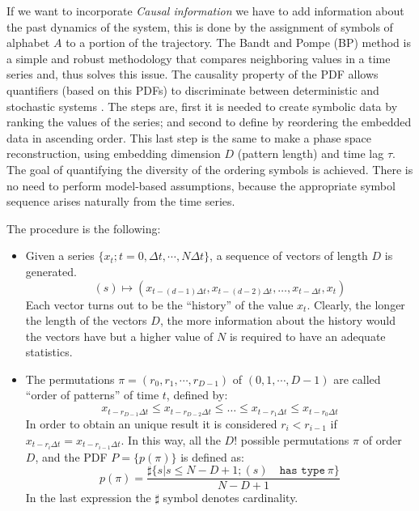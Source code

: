 If we want to incorporate {\it Causal information\/} we have to add information about the past dynamics of the system, this is done by the assignment of symbols of alphabet $A$ to a portion of the trajectory.
The Bandt and Pompe (BP) \cite{Bandt2002} method is a simple and robust methodology that compares neighboring values in a time series and, thus solves this issue.
The causality property of the PDF allows quantifiers (based on this PDFs) to discriminate between deterministic and stochastic systems \cite{Rosso2007B}.
The steps are, first it is needed to create  symbolic data by ranking the values of the series; and second to define by reordering the embedded data in ascending order.
This last step is the same to make a phase space reconstruction, using embedding dimension $D$ (pattern length) and time lag $\tau$.
The goal of quantifying the diversity of the ordering symbols is achieved.
There is no need to perform model-based assumptions, because the appropriate symbol sequence arises naturally from the time series.

The procedure is the following:
\begin{itemize}[leftmargin=*,labelsep=5.8mm]
\item 	Given a series $\{x_t; t=0, \Delta t, \cdots,N\Delta t \}$, a sequence of vectors of length $D$ is generated.
		\begin{equation}
		(s)\longmapsto\left(x_{t-(d-1)\Delta t},x_{t-(d-2)\Delta t},\dots,x_{t-\Delta t},x_{t}\right) 
		\label{eq:vectores}
		\end{equation}
		Each vector turns out to be the ``history'' of the value $x_t$. Clearly, the longer the length of the vectors $D$, the more information about the history would the vectors have but a higher value of $N$ is required to have an adequate statistics. 
\item 	The permutations $\pi=(r_0, r_1, \cdots, r_{D-1})$ of $(0, 1, \cdots, D-1)$ are called ``order of patterns'' of time $t$, defined by:
		\begin{equation}
		\label{eq:permuta}
		x_{t-r_{D-1}\Delta t}\le x_{t-r_{D-2}\Delta t}\le\dots\le x_{t-r_{1}\Delta t}\le x_{t-r_0\Delta t}
		\end{equation}
		In order to obtain an unique result it is considered $r_i<r_{i-1}$ if $x_{t-r_{i}\Delta t}=x_{t-r_{i-1}\Delta t}$.
		In this way, all the $D!$ possible permutations $\pi$ of order $D$, and the PDF $P=\{p(\pi)\}$ is defined as:
		\begin{equation}
		\label{eq:frequ}
		p(\pi)=\frac{\sharp \{s|s\leq N-D+1; (s) \quad \texttt{has type}~\pi\}}{N-D+1}
		\end{equation}
		In the last expression the $\sharp$ symbol denotes cardinality.
\end{itemize}


